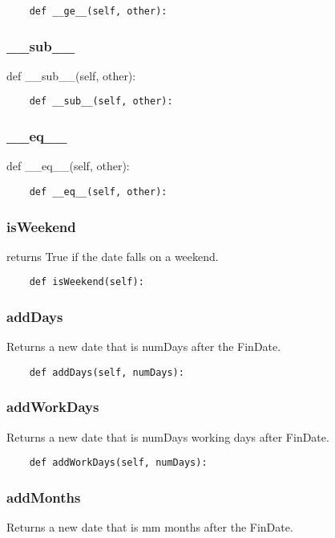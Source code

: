 \documentclass[twoside,11pt]{book}
\begin{document}
\begin{lstlisting}
    def __ge__(self, other):
\end{lstlisting}

\subsubsection*{{\bf \_\_sub\_\_}}
def \_\_sub\_\_(self, other): 

\begin{lstlisting}
    def __sub__(self, other):
\end{lstlisting}

\subsubsection*{{\bf \_\_eq\_\_}}
def \_\_eq\_\_(self, other): 

\begin{lstlisting}
    def __eq__(self, other):
\end{lstlisting}

\subsubsection*{{\bf isWeekend}}
returns True if the date falls on a weekend.  

\begin{lstlisting}
    def isWeekend(self):
\end{lstlisting}

\subsubsection*{{\bf addDays}}
Returns a new date that is numDays after the FinDate.  

\begin{lstlisting}
    def addDays(self, numDays):
\end{lstlisting}

\subsubsection*{{\bf addWorkDays}}
Returns a new date that is numDays working days after FinDate.  

\begin{lstlisting}
    def addWorkDays(self, numDays):
\end{lstlisting}

\subsubsection*{{\bf addMonths}}
Returns a new date that is mm months after the FinDate.  
\end{document}
